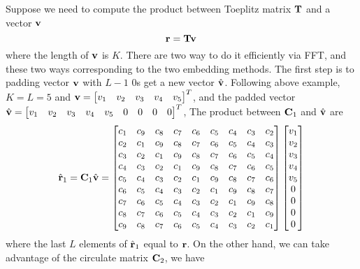 \documentclass[revised,endfloat]{geophysics}
\begin{document}
Suppose we need to compute the product between Toeplitz matrix ${\bf T}$ and a vector ${\bf v}$
\begin{equation}
{\bf r} = {\bf T}{\bf v} \,
\end{equation} 
where the length of ${\bf v}$ is $K$.
There are two way to do it efficiently via FFT, and these two ways corresponding to the two embedding methods. The first step is to padding vector ${\bf v}$ with $L-1$ $0$s get a new vector $\hat{\bf v}$. Following above example, $K=L=5$ and ${\bf v} = \begin{bmatrix} v_1 & v_2 & v_3 & v_4 & v_5  \end{bmatrix}^T$, and the padded vector $\hat{\bf v} = \begin{bmatrix} v_1 & v_2 & v_3 & v_4 & v_5 & 0 & 0 & 0 & 0 \end{bmatrix}^T$, The product between ${\bf C}_1$ and $\hat{\bf v}$ are
\begin{equation}
\hat{\bf r}_1 = {\bf C}_1 \hat{\bf v} = \begin{bmatrix}
c_1 & c_9 & c_8 & c_7 & c_6 & c_5 &  c_4 & c_3 & c_2 \\ 
c_2 & c_1 & c_9 & c_8 & c_7 & c_6 &  c_5 & c_4 & c_3 \\ 
c_3 & c_2 & c_1 & c_9 & c_8 & c_7 &  c_6 & c_5 & c_4 \\ 
c_4 & c_3 & c_2 & c_1 & c_9 & c_8 &  c_7 & c_6 & c_5 \\ 
c_5 & c_4 & c_3 & c_2 & c_1 & c_9 &  c_8 & c_7 & c_6 \\ 
c_6 & c_5 & c_4 & c_3 & c_2 & c_1 &  c_9 & c_8 & c_7 \\ 
c_7 & c_6 & c_5 & c_4 & c_3 & c_2 &  c_1 & c_9 & c_8 \\ 
c_8 & c_7 & c_6 & c_5 & c_4 & c_3 &  c_2 & c_1 & c_9 \\ 
c_9 & c_8 & c_7 & c_6 & c_5 & c_4 &  c_3 & c_2 & c_1 \\ 
\end{bmatrix}
\begin{bmatrix}
v_1 \\
v_2 \\
v_3 \\
v_4 \\
v_5 \\
0 \\
0 \\
0 \\
0 \\
\end{bmatrix}
\end{equation}
where the last $L$ elements of $\hat{\bf r}_1$ equal to ${\bf r}$. On the other hand, we can take advantage of the circulate matrix ${\bf C}_2$, we have
\end{document}

